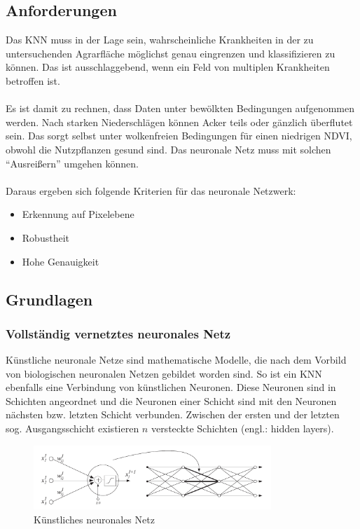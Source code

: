 \subsection{Anforderungen}\label{sec:sub:requirements}
Das KNN muss in der Lage sein, wahrscheinliche Krankheiten in der zu untersuchenden Agrarfläche möglichst genau eingrenzen und klassifizieren zu können. Das ist ausschlaggebend, wenn ein Feld von multiplen Krankheiten betroffen ist.
\\\\
Es ist damit zu rechnen, dass Daten unter bewölkten Bedingungen aufgenommen werden. Nach starken Niederschlägen können Acker teils oder gänzlich überflutet sein.\cite[S. 3]{ref:root-rot} Das sorgt selbst unter wolkenfreien Bedingungen für einen niedrigen NDVI, obwohl die Nutzpflanzen gesund sind. Das neuronale Netz muss mit solchen "`Ausreißern"' umgehen können.
\\\\
Daraus ergeben sich folgende Kriterien für das neuronale Netzwerk:

\begin{itemize}
	\item Erkennung auf Pixelebene
	\item Robustheit
	\item Hohe Genauigkeit 
\end{itemize}

\subsection{Grundlagen}\label{sec:sub:basics}

\subsubsection{Vollständig vernetztes neuronales Netz}

\noindent
Künstliche neuronale Netze sind mathematische Modelle, die nach dem Vorbild von biologischen neuronalen Netzen gebildet worden sind. So ist ein KNN ebenfalls eine Verbindung von künstlichen Neuronen. Diese Neuronen sind in Schichten angeordnet und die Neuronen einer Schicht sind mit den Neuronen nächsten bzw. letzten Schicht verbunden. Zwischen der ersten und der letzten sog. Ausgangsschicht existieren $n$ versteckte Schichten (engl.: hidden layers). 
\\
\begin{figure}[ht]
  \centering
  \includegraphics[width=0.8\textwidth]{pics/neural-net.PNG}
  \caption[Künstliches neuronales Netz]{Künstliches neuronales Netz\cite[S. 129]{ref:verrelst}}
  \label{fig:ann}
\end{figure}

